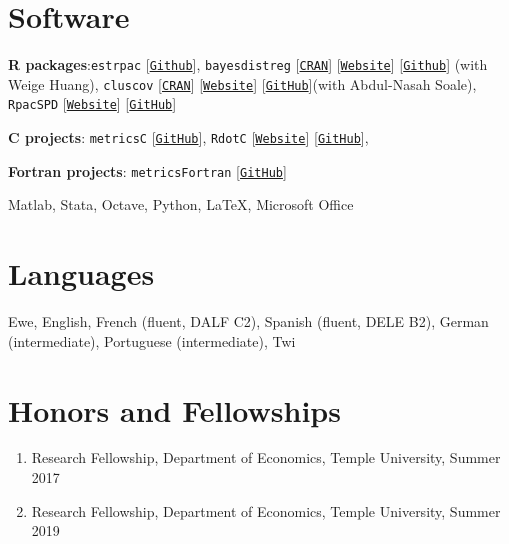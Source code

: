 \documentclass[12pt,letterpaper]{article}
\renewenvironment{itemize}{
  \begin{list}{}{
    \setlength{\leftmargin}{1.5em}
  }
}{
  \end{list}
}
\begin{document}
\section*{Software}
\begin{itemize}
  \item \textbf{R packages}:\texttt{estrpac} [\texttt{\href{https://github.com/estsyawo/estrpac}{Github}}], \texttt{bayesdistreg} [\texttt{\href{https://CRAN.R-project.org/package=bayesdistreg}{CRAN}}] [\texttt{\href{https://estsyawo.github.io/bayesdistreg/}{Website}}] [\texttt{\href{https://github.com/estsyawo/bayesdistreg}{Github}}] (with Weige Huang), \texttt{cluscov} [\texttt{\href{https://CRAN.R-project.org/package=cluscov}{CRAN}}] [\texttt{\href{https://estsyawo.github.io/cluscov/}{Website}}] [\texttt{\href{https://github.com/estsyawo/cluscov}{GitHub}}](with Abdul-Nasah Soale), \texttt{RpacSPD} [\texttt{\href{https://estsyawo.github.io/RpacSPD/}{Website}}] [\texttt{\href{https://github.com/estsyawo/RpacSPD}{GitHub}}]

  \item \textbf{C projects}: \texttt{metricsC} [\texttt{\href{https://github.com/estsyawo/metricsC}{GitHub}}], \texttt{RdotC} [\texttt{\href{https://estsyawo.github.io/RdotC/index.html}{Website}}] [\texttt{\href{https://github.com/estsyawo/RdotC}{GitHub}}], 
  
  \item \textbf{Fortran projects}: \texttt{metricsFortran} [\texttt{\href{https://github.com/estsyawo/metricsFortran}{GitHub}}]
  \item Matlab,  Stata, Octave, Python, \LaTeX, Microsoft Office
\end{itemize}

\section*{Languages}
Ewe, English, French (fluent, DALF C2), Spanish (fluent, DELE B2), German (intermediate),  Portuguese (intermediate), Twi

\section*{Honors and Fellowships}
\begin{enumerate}
  \item Research Fellowship, Department of Economics, Temple University, Summer 2017
  \item Research Fellowship, Department of Economics, Temple University, Summer 2019
\end{enumerate}
\end{document}
